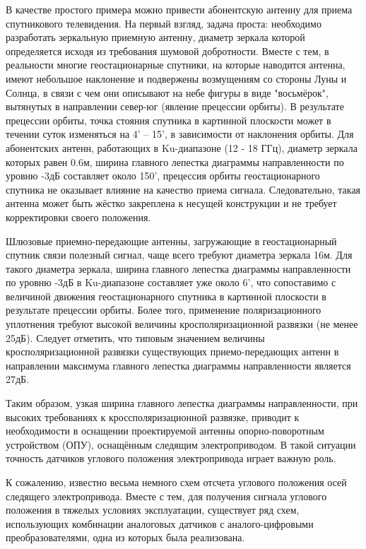 В качестве простого примера можно привести абонентскую антенну для приема спутникового телевидения. 
На первый взгляд, задача проста: необходимо разработать зеркальную приемную антенну, диаметр зеркала которой определяется исходя из требования шумовой добротности. 
Вместе с тем, в реальности многие геостационарные спутники, на которые наводится антенна, имеют небольшое наклонение и подвержены возмущениям со стороны Луны и Солнца, 
в связи с чем они описывают на небе фигуры в виде "восьмёрок", вытянутых в направлении север-юг (явление прецессии орбиты). 
В результате прецессии орбиты, точка стояния спутника в картинной плоскости может в течении суток изменяться на 4' – 15', в зависимости от наклонения орбиты. 
Для абонентских антенн, работающих в Ku-диапазоне (12 - 18 ГГц), диаметр зеркала которых равен 0.6м, ширина главного лепестка диаграммы направленности по уровню -3дБ составляет около 150', 
прецессия орбиты геостационарного спутника не оказывает влияние на качество приема сигнала. Следовательно, такая антенна может быть жёстко закреплена к несущей конструкции 
и не требует корректировки своего положения. 

Шлюзовые приемно-передающие антенны, загружающие в геостационарный спутник связи полезный сигнал, чаще всего требуют диаметра зеркала 16м. 
Для такого диаметра зеркала, ширина главного лепестка диаграммы направленности по уровню -3дБ в Ku-диапазоне составляет уже около 6', 
что сопоставимо с величиной движения геостационарного спутника в картинной плоскости в результате прецессии орбиты. 
Более того, применение поляризационного уплотнения требуют высокой величины кросполяризационной развязки (не менее 25дБ). 
Следует отметить, что типовым значением величины кросполяризационной развязки существующих приемо-передающих антенн 
в направлении максимума главного лепестка диаграммы направленности является 27дБ. 

Таким образом, узкая ширина главного лепестка диаграммы направленности, при высоких требованиях к кроссполяризационной развязке, 
приводит к необходимости в оснащении проектируемой антенны опорно-поворотным устройством (ОПУ), оснащённым следящим электроприводом.  
В такой ситуации точность датчиков углового положения электропривода играет важную роль.  

К сожалению, известно весьма немного схем отсчета углового положения осей следящего электропривода. Вместе с тем, для получения сигнала углового положения в тяжелых условиях эксплуатации, 
существует ряд схем, использующих комбинации аналоговых датчиков с аналого-цифровыми преобразователями, одна из которых была реализована.
